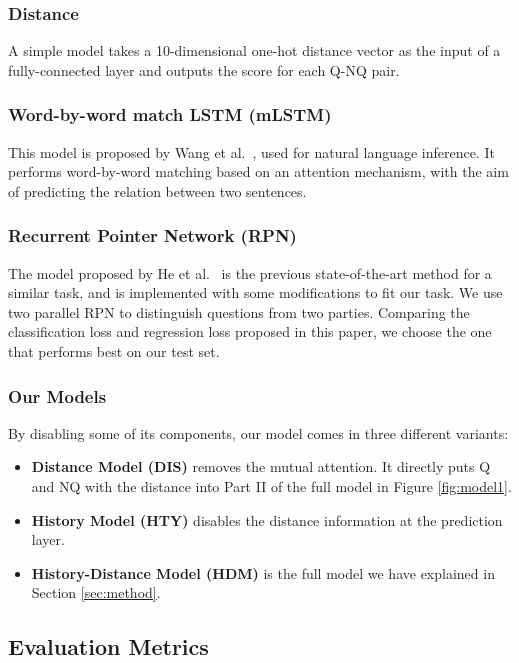 \subsubsection*{Distance}
A simple model takes a 10-dimensional one-hot distance vector as the input of a fully-connected layer and outputs the score for each Q-NQ pair.  


\subsubsection*{Word-by-word match LSTM (mLSTM)}
This model is proposed by Wang et al.~, used for natural language inference. It performs word-by-word matching based on an attention mechanism, with the aim of predicting the relation between two sentences.


\subsubsection*{Recurrent Pointer Network (RPN)}
The model proposed by He et al.~ is the previous
state-of-the-art method for a similar task, and is implemented with some modifications to fit our task. We use two parallel RPN to distinguish questions from two parties. Comparing the classification loss and regression loss proposed in this paper, we choose the one that performs best on our test set.


\subsubsection*{Our Models}
By disabling some of its components, our model comes in three different
variants:
\begin{itemize}

    \item \textbf{Distance Model (DIS)} removes the mutual attention. It directly puts Q and NQ with the distance into Part II of the full model in Figure \ref{fig:model1}.
    \item \textbf{History Model (HTY)} disables the distance information at the prediction layer.
    \item \textbf{History-Distance Model (HDM)} is the full model we have explained in Section \ref{sec:method}.
\end{itemize}


\subsection{Evaluation Metrics}

